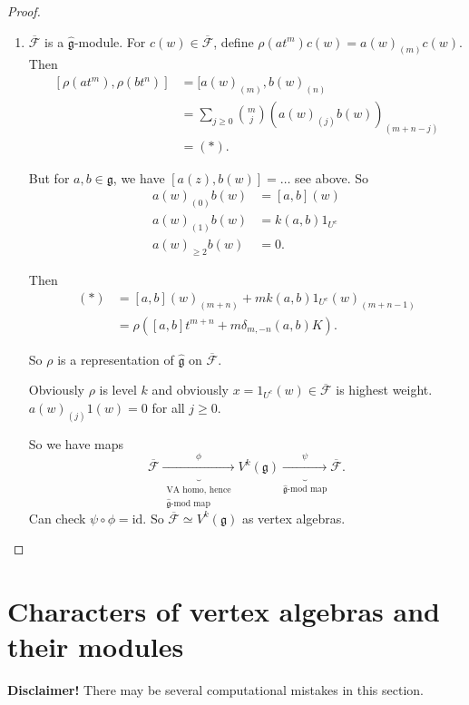 \begin{proof}
\begin{enumerate}
\item $\overline{\mathcal{F}}$ is a
$\hat{\mathfrak{g}}$-module.
For $c(w) \in \overline{\mathcal{F}}$,
define $\rho(at^m)c(w)=a(w)_{(m)}c(w)$.
Then
$$
\begin{aligned}
[\rho(at^m),\rho(bt^n)]&=[a(w)_{(m)},b(w)
_{(n)}\\
&=\sum_{j \geq
0}\binom{m}{j}(a(w)_{(j)}b(w))_{(m+n-j)}\\
&=(*).
\end{aligned}
$$

\noindent
But for $a,b \in \mathfrak{g}$, we have
$[a(z),b(w)]=\ldots$ see above.
So
$$
\begin{aligned}
a(w)_{(0)}b(w)&=[a,b](w)\\
a(w)_{(1)}b(w)&=k(a,b)1_{U^c}\\
a(w)_{\geq 2}b(w)&=0.
\end{aligned}
$$

\noindent
Then
$$
\begin{aligned}
(*)&=[a,b](w)_{(m+n)}+mk(a,b)1_{U^c}(w)_{(m+
n-1)}\\
&=\rho([a,b]t^{m+n}+m\delta_{m,-n}(a,b)K).
\end{aligned}
$$

\noindent
So $\rho$ is a representation of
$\hat{\mathfrak{g}}$ on
$\overline{\mathcal{F}}$.

Obviously $\rho$ is level $k$
and obviously $x=1_{U^c}(w) \in
\overline{\mathcal{F}}$
is highest weight.
$a(w)_{(j)}1(w)=0$ for all $j\geq 0$.

So we have maps
$$
\overline{\mathcal{F}}
\underbrace{\xrightarrow{\phi}}
_{\substack{\text{VA homo, hence} \\
\hat{\mathfrak{g}}\text{-mod map}}}
V^k(\mathfrak{g})
\underbrace{\xrightarrow{\psi}}_{
\hat{\mathfrak{g}}\text{-mod map}}
\overline{\mathcal{F}}.
$$
Can check $\psi \circ \phi=\text{id}$.
So $\overline{\mathcal{F}}\simeq
V^k(\mathfrak{g})$
as vertex algebras.
\end{enumerate}
\end{proof}


\section{Characters of vertex algebras and
their modules}
\label{section-characters-of-vertex-algebras}

\noindent
{\bf Disclaimer!} There may be several
computational mistakes in this section.

